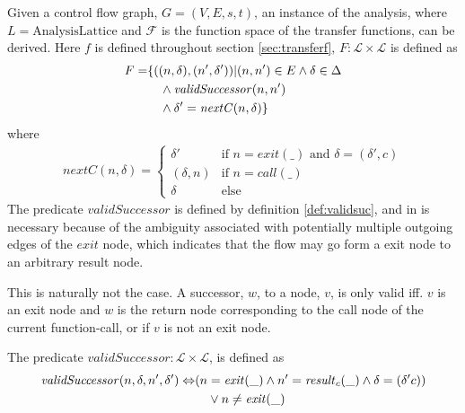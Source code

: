 Given a control flow graph, $G = (V,E,s,t)$, an instance of the analysis, where $L = \text{AnalysisLattice}$ and $\mathcal{F}$ is the function space of the transfer functions, can be derived. Here $f$ is defined throughout section \ref{sec:transferf}, $F : \mathcal{L} \times \mathcal{L}$ is defined as 
\begin{align}
F = &\{((n, \delta), (n', \delta')) | (n,n') \in E \wedge\delta \in \Delta \notag\\
&\quad \wedge \mathit{validSuccessor}(n, n')\notag\\
&\quad \wedge  \delta' = \mathit{nextC}( n, \delta)\}
\end{align} 
where 
\begin{align}
\mathit{nextC}(n,\delta) = 
	\begin{cases}
		\delta' & \text{if $n = \mathit{exit(\_)}$ and $\delta = (\delta', c)$}\\
		(\delta, n) &\text{if }n=\mathit{call}(\_)\\
		\delta &\text{else} 
	\end{cases}
\end{align} The predicate $\mathit{validSuccessor}$ is defined by definition \ref{def:validsuc}, and in is necessary because of the ambiguity associated with potentially multiple outgoing edges of the $\mathit{exit}$ node, which indicates that the flow may go form a exit node to an arbitrary result node.

This is naturally not the case. A successor, $w$, to a node, $v$, is only valid iff. $v$ is an exit node and $w$ is the return node corresponding to the call node of the current function-call, or if $v$ is not an exit node.

\begin{definition}
\label{def:validsuc}
The predicate $\mathit{validSuccessor} : \mathcal{L} \times \mathcal{L}$, is defined as
\begin{align}
\mathit{validSuccessor}(n, \delta, n', \delta') \Leftrightarrow &(n = \mathit{exit}(\_) \wedge n' = \mathit{result}_c(\_) \wedge \delta  = (\delta' c)) \notag\\
&\quad\vee n \neq \mathit{exit}(\_)
\end{align}
\end{definition}


